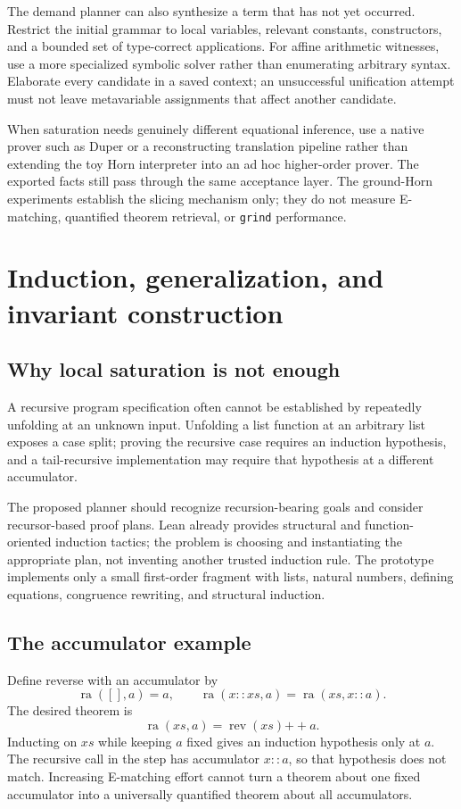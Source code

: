 \documentclass[11pt,letterpaper]{article}
\newcommand{\Lean}{\textsf{Lean}}
\newcommand{\grind}{\texttt{grind}}
\theoremstyle{definition}
\theoremstyle{remark}
\begin{document}
The demand planner can also synthesize a term that has not yet occurred. Restrict the initial grammar to local variables, relevant constants, constructors, and a bounded set of type-correct applications. For affine arithmetic witnesses, use a more specialized symbolic solver rather than enumerating arbitrary syntax. Elaborate every candidate in a saved context; an unsuccessful unification attempt must not leave metavariable assignments that affect another candidate.

When saturation needs genuinely different equational inference, use a native prover such as Duper or a reconstructing translation pipeline rather than extending the toy Horn interpreter into an ad hoc higher-order prover. The exported facts still pass through the same acceptance layer. The ground-Horn experiments establish the slicing mechanism only; they do not measure E-matching, quantified theorem retrieval, or \grind{} performance.

\section{Induction, generalization, and invariant construction}
\subsection{Why local saturation is not enough}
A recursive program specification often cannot be established by repeatedly unfolding at an unknown input. Unfolding a list function at an arbitrary list exposes a case split; proving the recursive case requires an induction hypothesis, and a tail-recursive implementation may require that hypothesis at a different accumulator.

The proposed planner should recognize recursion-bearing goals and consider recursor-based proof plans. \Lean{} already provides structural and function-oriented induction tactics; the problem is choosing and instantiating the appropriate plan, not inventing another trusted induction rule.\cite{tactics} The prototype implements only a small first-order fragment with lists, natural numbers, defining equations, congruence rewriting, and structural induction.

\subsection{The accumulator example}
Define reverse with an accumulator by
\[
\operatorname{ra}([],a)=a,\qquad
\operatorname{ra}(x::xs,a)=\operatorname{ra}(xs,x::a).
\]
The desired theorem is
\begin{equation}\label{eq:ra}
\operatorname{ra}(xs,a)=\operatorname{rev}(xs)\mathbin{++}a.
\end{equation}
Inducting on $xs$ while keeping $a$ fixed gives an induction hypothesis only at $a$. The recursive call in the step has accumulator $x::a$, so that hypothesis does not match. Increasing E-matching effort cannot turn a theorem about one fixed accumulator into a universally quantified theorem about all accumulators.
\end{document}
